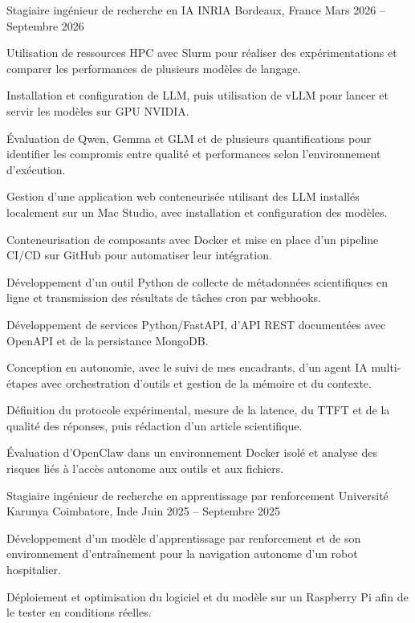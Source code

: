 
\begin{cventries}
  \cventry
    {Stagiaire ingénieur de recherche en IA}
    {INRIA}
    {Bordeaux, France}
    {Mars 2026 -- Septembre 2026}
    {
      \begin{cvitems}
        \item {Utilisation de ressources HPC avec Slurm pour réaliser des expérimentations et comparer les performances de plusieurs modèles de langage.}
        \item {Installation et configuration de LLM, puis utilisation de vLLM pour lancer et servir les modèles sur GPU NVIDIA.}
        \item {Évaluation de Qwen, Gemma et GLM et de plusieurs quantifications pour identifier les compromis entre qualité et performances selon l’environnement d’exécution.}
        \item {Gestion d’une application web conteneurisée utilisant des LLM installés localement sur un Mac Studio, avec installation et configuration des modèles.}
        \item {Conteneurisation de composants avec Docker et mise en place d’un pipeline CI/CD sur GitHub pour automatiser leur intégration.}
        \item {Développement d’un outil Python de collecte de métadonnées scientifiques en ligne et transmission des résultats de tâches cron par webhooks.}
        \item {Développement de services Python/FastAPI, d’API REST documentées avec OpenAPI et de la persistance MongoDB.}
        \item {Conception en autonomie, avec le suivi de mes encadrants, d’un agent IA multi-étapes avec orchestration d’outils et gestion de la mémoire et du contexte.}
        \item {Définition du protocole expérimental, mesure de la latence, du TTFT et de la qualité des réponses, puis rédaction d’un article scientifique.}
        \item {Évaluation d’OpenClaw dans un environnement Docker isolé et analyse des risques liés à l’accès autonome aux outils et aux fichiers.}
      \end{cvitems}
    }

  \cventry
    {Stagiaire ingénieur de recherche en apprentissage par renforcement}
    {Université Karunya}
    {Coimbatore, Inde}
    {Juin 2025 -- Septembre 2025}
    {
      \begin{cvitems}
        \item {Développement d’un modèle d’apprentissage par renforcement et de son environnement d’entraînement pour la navigation autonome d’un robot hospitalier.}
        \item {Déploiement et optimisation du logiciel et du modèle sur un Raspberry Pi afin de le tester en conditions réelles.}
      \end{cvitems}
    }
\end{cventries}
